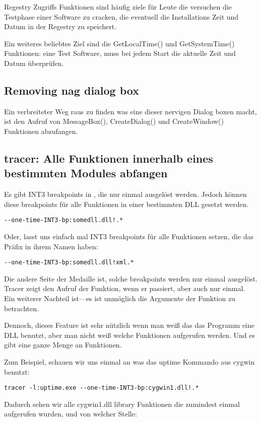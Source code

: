 Regestry Zugriffs Funktionen sind häufig ziele für Leute die versuchen die Testphase einer Software zu cracken, die 
eventuell die Installations Zeit und Datum in der Regestry zu speichert. 

Ein weiteres beliebtes Ziel sind die GetLocalTime() und GetSystemTime() Funktionen:
eine Test Software, muss bei jedem Start die aktuelle Zeit und Datum überprüfen.

\subsection{Removing nag dialog box}

Ein verbreiteter Weg raus zu finden was eine dieser nervigen Dialog boxen macht, ist den 
Aufruf von MessageBox(), CreateDialog() und CreateWindow() Funktionen abzufangen.


\subsection{tracer: Alle Funktionen innerhalb eines bestimmten Modules abfangen}


Es gibt INT3 breakpoints in \tracer, die nur einmal ausgelöst werden. Jedoch können diese breakpoints für alle 
Funktionen in einer bestimmten DLL gesetzt werden.

\begin{lstlisting}
--one-time-INT3-bp:somedll.dll!.*
\end{lstlisting}

Oder, lasst uns einfach mal INT3 breakpoints für alle Funktionen setzen, die das  Präfix in ihrem Namen haben:

\begin{lstlisting}
--one-time-INT3-bp:somedll.dll!xml.*
\end{lstlisting}

Die andere Seite der Medaille ist, solche breakpoints werden nur einmal ausgelöst.
Tracer zeigt den Aufruf der Funktion, wenn er passiert, aber auch nur einmal. 
Ein weiterer Nachteil ist---es ist unmöglich die Argumente der Funktion zu betrachten.

Dennoch, dieses Feature ist sehr nützlich wenn man weiß das das Programm eine DLL benutzt,
aber man nicht weiß welche Funktionen aufgerufen werden. Und es gibt eine ganze Menge an 
Funktionen.


\par
{}
Zum Beispiel, schauen wir uns einmal an was das uptime Kommando aus cygwin benutzt:

\begin{lstlisting}
tracer -l:uptime.exe --one-time-INT3-bp:cygwin1.dll!.*
\end{lstlisting}

Dadurch sehen wir alle cygwin1.dll library Funktionen die zumindest einmal aufgerufen wurden, und von welcher
Stelle: 


